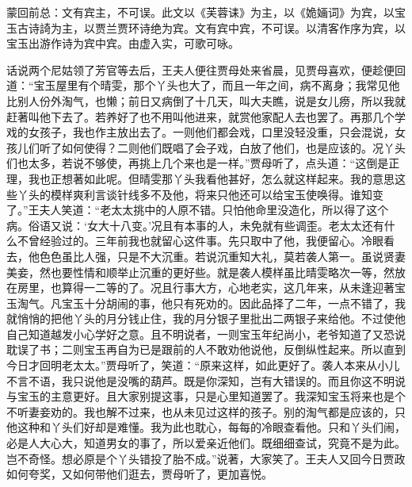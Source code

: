 

\begin{parag}
    \begin{note}蒙回前总：文有宾主，不可误。此文以《芙蓉诔》为主，以《姽婳词》为宾，以宝玉古诗䛴为主，以贾兰贾环诗绝为宾。文有宾中宾，不可误。以清客作序为宾，以宝玉出游作诗为宾中宾。由虚入实，可歌可咏。\end{note}
\end{parag}


\begin{parag}
    话说两个尼姑领了芳官等去后，王夫人便往贾母处来省晨，见贾母喜欢，便趁便回道：“宝玉屋里有个晴雯，那个丫头也大了，而且一年之间，病不离身；我常见他比别人份外淘气，也懒；前日又病倒了十几天，叫大夫瞧，说是女儿痨，所以我就赶著叫他下去了。若养好了也不用叫他进来，就赏他家配人去也罢了。再那几个学戏的女孩子，我也作主放出去了。一则他们都会戏，口里没轻没重，只会混说，女孩儿们听了如何使得？二则他们既唱了会子戏，白放了他们，也是应该的。况丫头们也太多，若说不够使，再挑上几个来也是一样。”贾母听了，点头道：“这倒是正理，我也正想著如此呢。但晴雯那丫头我看他甚好，怎么就这样起来。我的意思这些丫头的模样爽利言谈针线多不及他，将来只他还可以给宝玉使唤得。谁知变了。”王夫人笑道：“老太太挑中的人原不错。只怕他命里没造化，所以得了这个病。俗语又说：‘女大十八变。’况且有本事的人，未免就有些调歪。老太太还有什么不曾经验过的。三年前我也就留心这件事。先只取中了他，我便留心。冷眼看去，他色色虽比人强，只是不大沉重。若说沉重知大礼，莫若袭人第一。虽说贤妻美妾，然也要性情和顺举止沉重的更好些。就是袭人模样虽比晴雯略次一等，然放在房里，也算得一二等的了。况且行事大方，心地老实，这几年来，从未逢迎著宝玉淘气。凡宝玉十分胡闹的事，他只有死劝的。因此品择了二年，一点不错了，我就悄悄的把他丫头的月分钱止住，我的月分银子里批出二两银子来给他。不过使他自己知道越发小心学好之意。且不明说者，一则宝玉年纪尚小，老爷知道了又恐说耽误了书；二则宝玉再自为已是跟前的人不敢劝他说他，反倒纵性起来。所以直到今日才回明老太太。”贾母听了，笑道：“原来这样，如此更好了。袭人本来从小儿不言不语，我只说他是没嘴的葫芦。既是你深知，岂有大错误的。而且你这不明说与宝玉的主意更好。且大家别提这事，只是心里知道罢了。我深知宝玉将来也是个不听妻妾劝的。我也解不过来，也从未见过这样的孩子。别的淘气都是应该的，只他这种和丫头们好却是难懂。我为此也耽心，每每的冷眼查看他。只和丫头们闹，必是人大心大，知道男女的事了，所以爱亲近他们。既细细查试，究竟不是为此。岂不奇怪。想必原是个丫头错投了胎不成。”说著，大家笑了。王夫人又回今日贾政如何夸奖，又如何带他们逛去，贾母听了，更加喜悦。
\end{parag}


